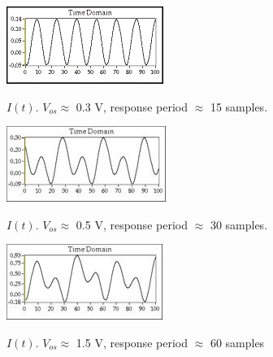 \documentclass{../lab}
\begin{document}
\begin{figure}[h]
\begin{minipage}{0.32\textwidth}
    \href{http://experimentationlab.berkeley.edu/sites/default/files/images/Nldimage014.gif}{\includegraphics[width=\linewidth,keepaspectratio]{images/Nldimage014.png}}
    \caption{$I(t)$. $V_{os} \approx$ 0.3 V, response period $\approx$ 15 samples.}
    \label{fig:Period15}
\end{minipage}\hfill
\begin{minipage}{0.32\textwidth}
    \href{http://experimentationlab.berkeley.edu/sites/default/files/images/Nldimage015.jpg}{\includegraphics[width=\linewidth,keepaspectratio]{images/Nldimage015.jpg}}
    \caption{$I(t)$. $V_{os} \approx$ 0.5 V, response period $\approx$ 30 samples.}
    \label{fig:Period30}
\end{minipage}\hfill
\begin{minipage}{0.32\textwidth}
    \href{http://experimentationlab.berkeley.edu/sites/default/files/images/Nldimage016.jpg}{\includegraphics[width=\linewidth,keepaspectratio]{images/Nldimage016.jpg}}
    \caption{$I(t)$. $V_{os} \approx$ 1.5 V, response period $\approx$ 60 samples}
    \label{fig:Period60}
\end{minipage}
\end{figure}
\end{document}
